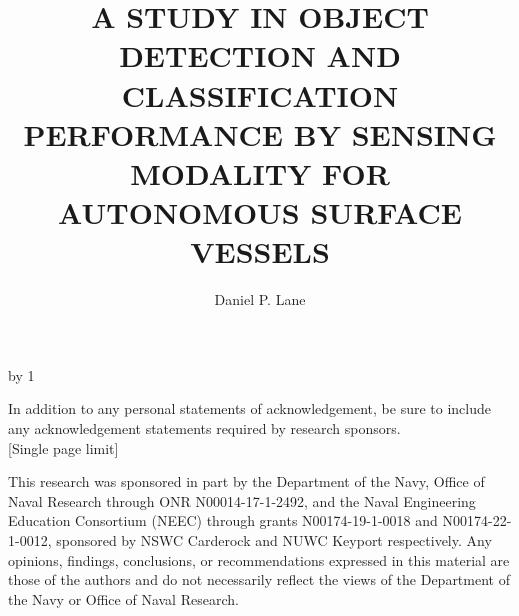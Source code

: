 \documentclass{erauthesis}
\title{A STUDY IN OBJECT DETECTION AND CLASSIFICATION
PERFORMANCE BY SENSING MODALITY FOR AUTONOMOUS
SURFACE VESSELS} %
\author{Daniel P. Lane}
\begin{document}
\frontmatter

\maketitle

\makeatletter 
\advance\fau@frontstage by 1  %

\begin{acknowledgements}

    \raggedright In addition to any personal statements of acknowledgement, be sure to include any acknowledgement statements required by research sponsors.\\{[Single page limit]} 

    \raggedright This research was sponsored in part by the Department of the Navy, Office of Naval Research through ONR N00014-17-1-2492, and the Naval Engineering Education Consortium (NEEC) through grants N00174-19-1-0018 and N00174-22-1-0012, sponsored by NSWC Carderock and NUWC Keyport respectively. Any opinions, findings, conclusions, or recommendations expressed in this material are those of the authors and do not necessarily reflect the views of the Department of the Navy or Office of Naval Research.
\end{acknowledgements}
\end{document}
